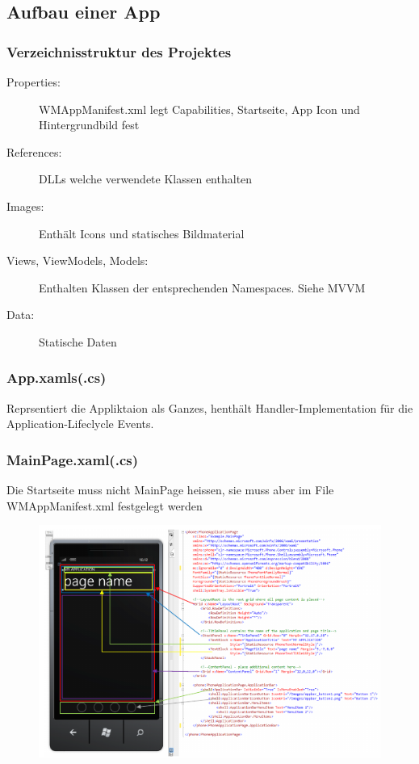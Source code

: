 \documentclass[a4paper,10pt]{scrreprt}
\begin{document}
\newpage
\subsection{Aufbau einer App}
\subsubsection{Verzeichnisstruktur des Projektes}
\begin{description}
	\item[Properties:] WMAppManifest.xml legt Capabilities, Startseite, App Icon und Hintergrundbild fest
	\item[References:] DLLs welche verwendete Klassen enthalten
	\item[Images:] Enthält Icons und statisches Bildmaterial
	\item[Views, ViewModels, Models:] Enthalten Klassen der entsprechenden Namespaces. Siehe MVVM
	\item[Data:] Statische Daten
\end{description}
\subsubsection{App.xamls(.cs)}
Reprsentiert die Appliktaion als Ganzes, henthält Handler-Implementation für die Application-Lifeclycle Events.
\subsubsection{MainPage.xaml(.cs)}
Die Startseite muss nicht MainPage heissen, sie muss aber im File WMAppManifest.xml festgelegt werden
\begin{figure}[h!]
 \centering
 \includegraphics{./aufbau.png}
\end{figure}
\newpage
\end{document}
